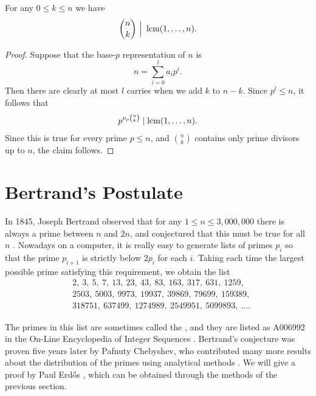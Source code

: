 \begin{corollary}\label{corollary:kummers-theorem}
  For any $0\leq k\leq n$ we have
  \begin{equation*}
    \binom{n}{k}\,\,\Big|\,\,\operatorname*{lcm}(1,\ldots,n).
  \end{equation*}
\end{corollary}

\begin{proof}
  Suppose that the base-$p$ representation of $n$ is
  \begin{equation*}
    n=\sum_{i=0}^{l}a_ip^i.
  \end{equation*}
  Then there are clearly at most $l$ carries when we add $k$ to $n-k$. Since $p^l\leq n$, it follows that
  \begin{equation*}
    p^{\nu_p\binom{n}{k}}\mid\operatorname*{lcm}(1,\ldots,n).
  \end{equation*}
  Since this is true for every prime $p\leq n$, and $\binom{n}{k}$ contains only prime divisors up to $n$, the claim follows.
\end{proof}

\section{Bertrand's Postulate}

In 1845, Joseph Bertrand observed that for any $1\leq n \leq 3,000,000$ there is always a prime between $n$ and $2n$, and conjectured that this must be true for all $n$ \cite{bertrand1845}. Nowadays on a computer, it is really easy to generate lists of primes $p_i$ so that the prime $p_{i+1}$ is strictly below $2p_i$ for each $i$. Taking each time the largest possible prime satisfying this requirement, we obtain the list
\begin{align*}
  &2,\ 3,\ 5,\ 7,\ 13,\ 23,\ 43,\ 83,\ 163,\ 317,\ 631,\ 1259,\\
  &2503,\ 5003,\ 9973,\ 19937,\ 39869,\ 79699,\ 159389,\\
  &318751,\ 637499,\ 1274989,\ 2549951,\ 5099893,\ \ldots.
\end{align*}

The primes in this list are sometimes called the , and they are listed as A006992 in the On-Line Encyclopedia of Integer Sequences \cite{oeis:A006992}. Bertrand's conjecture was proven five years later by Pafnuty Chebyshev, who contributed many more results about the distribution of the primes using analytical methods \cite{chebyshev1850}. We will give a proof by Paul Erd\H{o}s \cite{erdos1932}, which can be obtained through the methods of the previous section.

